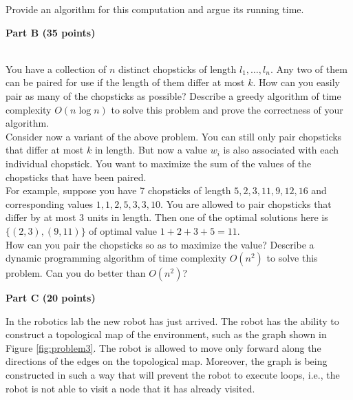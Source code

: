 \documentclass{article}
\begin{document}
\noindent Provide an algorithm for this computation and argue its
running time.


\begin{center}
{\bf Part B (35 points)}
\end{center}

\\

 You have a collection of $n$ distinct chopsticks of
length $l_{1},\dots,l_{n}$. Any two of them can be paired for use if
the length of them differ at most $k$. How can you easily pair as many
of the chopsticks as possible? Describe a greedy algorithm of time
complexity $O(n\log n)$ to solve this problem and prove the
correctness of your algorithm.\\

 Consider now a variant of the above problem. You
can still only pair chopsticks that differ at most $k$ in length. But
now a value $w_{i}$ is also associated with each individual
chopstick. You want to maximize the sum of the values of the
chopsticks that have been paired.\\

\noindent For example, suppose you have 7 chopsticks of length
$5,2,3,11,9,12,16$ and corresponding values $1,1,2,5,3,3,10$. You are
allowed to pair chopsticks that differ by at most 3 units in
length. Then one of the optimal solutions here is $\{ (2,3),(9,11) \}$
of optimal value $1+2+3+5=11$.\\

\noindent How can you pair the chopsticks so as to maximize the value?
Describe a dynamic programming algorithm of time complexity $O(n^{2})$
to solve this problem. Can you do better than $O(n^{2})$?\\

\begin{center}
{\bf Part C (20 points)}
\end{center}


 In the robotics lab the new robot has just
arrived. The robot has the ability to construct a topological map of
the environment, such as the graph shown in Figure
\ref{fig:problem3}. The robot is allowed to move only forward along
the directions of the edges on the topological map. Moreover, the
graph is being constructed in such a way that will prevent the robot
to execute loops, i.e., the robot is not able to visit a node that it
has already visited.\\
\end{document}
